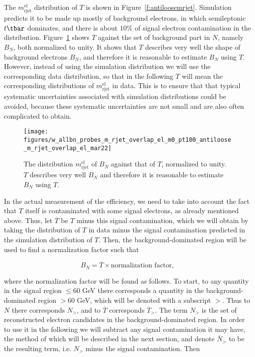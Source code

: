 The $m_{\text{rjet}}^{\text{el}}$ distribution of $T$ is shown in
Figure~\ref{f:antiloosemrjet}. Simulation predicts it to be made up mostly of
background electrons, in which semileptonic $t\tbar$ dominates, and there is
about $10\%$ of signal electron contamination in the distribution.
Figure~\ref{f:shapebeforeafter} shows $T$ against the set of background part in
$N$, namely $B_N$, both normalized to unity. It shows that $T$ describes very
well the shape of background electrons $B_N$, and therefore it is reasonable to
estimate $B_N$ using $T$. However, instead of using the simulation distribution
we will use the corresponding data distribution, so that in the following $T$
will mean the corresponding distributions of $m_{\text{rjet}}^{\text{el}}$ in
data. This is to ensure that that typical systematic uncertainties associated
with simulation distributions could be avoided, because these systematic
uncertainties are not small and are also often complicated to obtain.

\begin{figure}[H]
	\texttt{[image: figures/w\_allbn\_probes\_m\_rjet\_overlap\_el\_m0\_pt100\_antiloose\_m\_rjet\_overlap\_el\_mar22]}
	\centering
	\caption{The distribution $m_{\text{rjet}}^{\text{el}}$ of $B_N$ against that
		of $T$, normalized to unity. $T$ describes very well $B_N$ and therefore it is
		reasonable to estimate $B_N$ using $T$.}
	\label{f:shapebeforeafter}
\end{figure}


In the actual measurement of the efficiency, we need to take into account the
fact that $T$ itself is contaminated with some signal electrons, as already
mentioned above. Thus, let $\overline{T}$ be $T$ minus this signal
contamination, which we will obtain by taking the distribution of $T$ in data
minus the signal contamination predicted in the simulation distribution of $T$.
Then, the background-dominated region will be used to find a normalization
factor such that

%
$$B_N = \overline{T} \times \text{normalization factor},$$
%

where the normalization factor will be found as follows. To start, to any
quantity in the signal region $\leq 60$ GeV there corresponds a quantity in the
background-dominated region $> 60$ GeV, which will be denoted with a subscript
$>$. Thus to $N$ there corresponds $N_>$, and to $\overline{T}$ corresponds
$\overline{T}_>$. The term $N_>$ is the set of reconstructed electron
candidates in the background-dominated region. In order to use it in the
following we will subtract any signal contamination it may have, the method of
which will be described in the next section, and denote $\overline{N}_>$ to be
the resulting term, i.e. $N_>$ minus the signal contamination. Then

